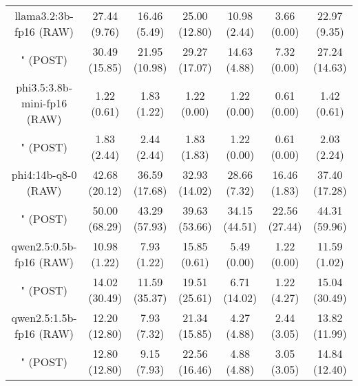 \begin{table}[]
{\begin{tabular}{ccccccc}
      \multicolumn{1}{c|}{llama3.2:3b-fp16 (RAW)} & 27.44 (9.76) & 16.46 (5.49) & \multicolumn{1}{c|}{25.00 (12.80)} & 10.98 (2.44) & \multicolumn{1}{c|}{3.66 (0.00)} & 22.97 (9.35) \\

      \multicolumn{1}{c|}{" (POST)} & 30.49 (15.85) & 21.95 (10.98) & \multicolumn{1}{c|}{29.27 (17.07)} & 14.63 (4.88) & \multicolumn{1}{c|}{7.32 (0.00)} & 27.24 (14.63) \\
      \cline{1-7}

      \multicolumn{1}{c|}{phi3.5:3.8b-mini-fp16 (RAW)} & 1.22 (0.61) & 1.83 (1.22) & \multicolumn{1}{c|}{1.22 (0.00)} & 1.22 (0.00) & \multicolumn{1}{c|}{0.61 (0.00)} & 1.42 (0.61) \\

      \multicolumn{1}{c|}{" (POST)} & 1.83 (2.44) & 2.44 (2.44) & \multicolumn{1}{c|}{1.83 (1.83)} & 1.22 (0.00) & \multicolumn{1}{c|}{0.61 (0.00)} & 2.03 (2.24) \\
      \cline{1-7}

      \multicolumn{1}{c|}{phi4:14b-q8-0 (RAW)} & 42.68 (20.12) & 36.59 (17.68) & \multicolumn{1}{c|}{32.93 (14.02)} & 28.66 (7.32) & \multicolumn{1}{c|}{16.46 (1.83)} & 37.40 (17.28) \\

      \multicolumn{1}{c|}{" (POST)} & 50.00 (68.29) & 43.29 (57.93) & \multicolumn{1}{c|}{39.63 (53.66)} & 34.15 (44.51) & \multicolumn{1}{c|}{22.56 (27.44)} & 44.31 (59.96) \\
      \cline{1-7}

      \multicolumn{1}{c|}{qwen2.5:0.5b-fp16 (RAW)} & 10.98 (1.22) & 7.93 (1.22) & \multicolumn{1}{c|}{15.85 (0.61)} & 5.49 (0.00) & \multicolumn{1}{c|}{1.22 (0.00)} & 11.59 (1.02) \\

      \multicolumn{1}{c|}{" (POST)} & 14.02 (30.49) & 11.59 (35.37) & \multicolumn{1}{c|}{19.51 (25.61)} & 6.71 (14.02) & \multicolumn{1}{c|}{1.22 (4.27)} & 15.04 (30.49) \\
      \cline{1-7}

      \multicolumn{1}{c|}{qwen2.5:1.5b-fp16 (RAW)} & 12.20 (12.80) & 7.93 (7.32) & \multicolumn{1}{c|}{21.34 (15.85)} & 4.27 (4.88) & \multicolumn{1}{c|}{2.44 (3.05)} & 13.82 (11.99) \\

      \multicolumn{1}{c|}{" (POST)} & 12.80 (12.80) & 9.15 (7.93) & \multicolumn{1}{c|}{22.56 (16.46)} & 4.88 (4.88) & \multicolumn{1}{c|}{3.05 (3.05)} & 14.84 (12.40) \\
      \cline{1-7}


\end{tabular}}
\end{table}
